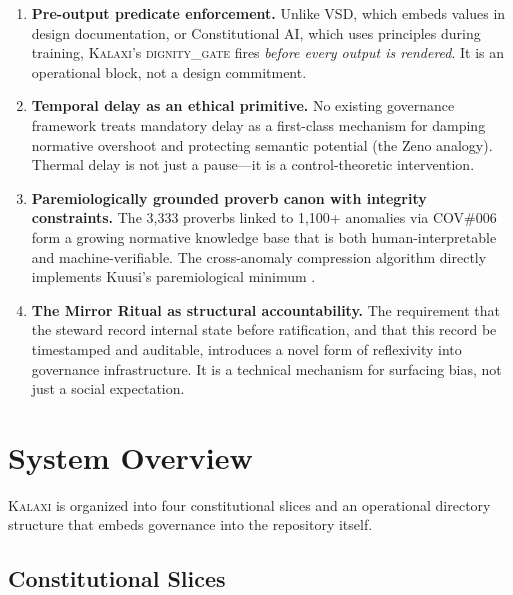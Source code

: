 \documentclass[12pt,a4paper]{article}
\theoremstyle{definition}
\theoremstyle{remark}
\newcommand{\dignitygate}{\textsc{dignity\_gate}}
\newcommand{\kalaxi}{\textsc{Kalaxi}}
\begin{document}
\begin{enumerate}
\item \textbf{Pre-output predicate enforcement.} Unlike VSD, which embeds values in
  design documentation, or Constitutional AI, which uses principles during training,
  \kalaxi{}’s \dignitygate{} fires \emph{before every output is rendered}. It is an
  operational block, not a design commitment.

\item \textbf{Temporal delay as an ethical primitive.} No existing governance framework
  treats mandatory delay as a first-class mechanism for damping normative overshoot
  and protecting semantic potential (the Zeno analogy). Thermal delay is not just a
  pause—it is a control-theoretic intervention.

\item \textbf{Paremiologically grounded proverb canon with integrity constraints.}
  The 3,333 proverbs linked to 1,100+ anomalies via COV\#006 form a growing normative
  knowledge base that is both human-interpretable and machine-verifiable. The
  cross-anomaly compression algorithm directly implements Kuusi’s paremiological
  minimum \cite{lauhakangas2014}.

\item \textbf{The Mirror Ritual as structural accountability.} The requirement that
  the steward record internal state before ratification, and that this record be
  timestamped and auditable, introduces a novel form of reflexivity into governance
  infrastructure. It is a technical mechanism for surfacing bias, not just a social
  expectation.
\end{enumerate}

\section{System Overview}
\label{sec:overview}

\kalaxi{} is organized into four constitutional slices and an operational directory
structure that embeds governance into the repository itself.

\subsection{Constitutional Slices}
\end{document}
